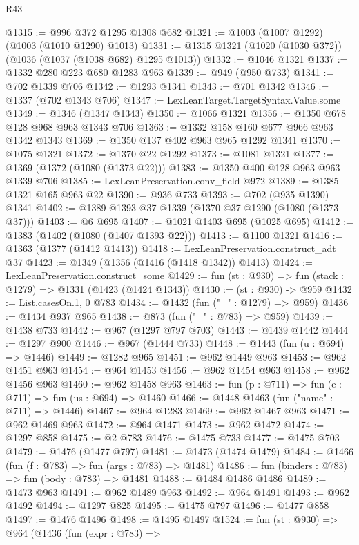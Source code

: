 \begin{lexlean}{R43}
\begin{coremodule}
@1315 := @996 @372 @1295 @1308 @682
@1321 := @1003 (@1007 @1292) (@1003 (@1010 @1290) @1013)
@1331 := @1315 @1321 (@1020 (@1030 @372)) (@1036 (@1037 (@1038 @682) @1295 @1013))
@1332 := @1046 @1321
@1337 := @1332 @280 @223 @680 @1283 @963
@1339 := @949 (@950 @733)
@1341 := @702 @1339 @706
@1342 := @1293 @1341
@1343 := @701 @1342
@1346 := @1337 (@702 @1343 @706)
@1347 := LexLeanTarget.TargetSyntax.Value.some
@1349 := @1346 (@1347 @1343)
@1350 := @1066 @1321
@1356 := @1350 @678 @128 @968 @963 @1343 @706
@1363 := @1332 @158 @160 @677 @966 @963 @1342 @1343
@1369 := @1350 @137 @402 @963 @965 @1292 @1341
@1370 := @1075 @1321
@1372 := @1370 @22 @1292
@1373 := @1081 @1321
@1377 := @1369 (@1372 (@1080 (@1373 @22)))
@1383 := @1350 @400 @128 @963 @963 @1339 @706
@1385 := LexLeanPreservation.conv_field @972
@1389 := @1385 @1321 @165 @963 @22
@1390 := @936 @733
@1393 := @702 (@935 @1390) @1341
@1402 := @1389 @1393 @37 @1339 (@1370 @37 @1290 (@1080 (@1373 @37)))
@1403 := @6 @695
@1407 := @1021 @1403 @695 (@1025 @695)
@1412 := @1383 (@1402 (@1080 (@1407 @1393 @22)))
@1413 := @1100 @1321
@1416 := @1363 (@1377 (@1412 @1413))
@1418 := LexLeanPreservation.construct_adt @37
@1423 := @1349 (@1356 (@1416 (@1418 @1342)) @1413)
@1424 := LexLeanPreservation.construct_some
@1429 := fun (st : @930) => fun (stack : @1279) => @1331 (@1423 (@1424 @1343))
@1430 := (st : @930) -> @959
@1432 := List.casesOn.{1, 0} @783
@1434 := @1432 (fun ("_" : @1279) => @959)
@1436 := @1434 @937 @965
@1438 := @873 (fun ("_" : @783) => @959)
@1439 := @1438 @733
@1442 := @967 (@1297 @797 @703)
@1443 := @1439 @1442
@1444 := @1297 @900
@1446 := @967 (@1444 @733)
@1448 := @1443 (fun (u : @694) => @1446)
@1449 := @1282 @965
@1451 := @962 @1449 @963
@1453 := @962 @1451 @963
@1454 := @964 @1453
@1456 := @962 @1454 @963
@1458 := @962 @1456 @963
@1460 := @962 @1458 @963
@1463 := fun (p : @711) => fun (e : @711) => fun (us : @694) => @1460
@1466 := @1448 @1463 (fun ("name" : @711) => @1446)
@1467 := @964 @1283
@1469 := @962 @1467 @963
@1471 := @962 @1469 @963
@1472 := @964 @1471
@1473 := @962 @1472
@1474 := @1297 @858
@1475 := @2 @783
@1476 := @1475 @733
@1477 := @1475 @703
@1479 := @1476 (@1477 @797)
@1481 := @1473 (@1474 @1479)
@1484 := @1466 (fun (f : @783) => fun (args : @783) => @1481)
@1486 := fun (binders : @783) => fun (body : @783) => @1481
@1488 := @1484 @1486 @1486
@1489 := @1473 @963
@1491 := @962 @1489 @963
@1492 := @964 @1491
@1493 := @962 @1492
@1494 := @1297 @825
@1495 := @1475 @797
@1496 := @1477 @858
@1497 := @1476 @1496
@1498 := @1495 @1497
@1524 := fun (st : @930) =>
  @964
    (@1436
      (fun (expr : @783) =>

\end{coremodule}
\end{lexlean}
